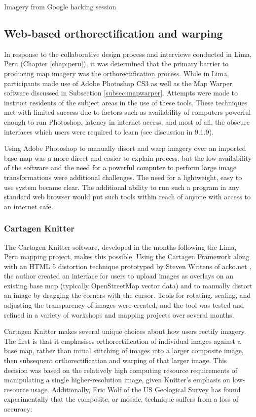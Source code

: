 \documentclass[11pt]{report}
\begin{document}
Imagery from Google hacking session

\subsection{Web-based orthorectification and warping}

In response to the collaborative design process and interviews conducted in Lima, Peru (Chapter \ref{chap:peru}), it was determined that the primary barrier to producing map imagery was the orthorectification process. While in Lima, participants made use of Adobe Photoshop CS3 as well as the Map Warper software discussed in Subsection \ref{subsec:mapwarper}. Attempts were made to instruct residents of the subject areas in the use of these tools. These techniques met with limited success due to factors such as availability of computers powerful enough to run Photoshop, latency in internet access, and most of all, the obscure interfaces which users were required to learn (see discussion in 9.1.9).  

Using Adobe Photoshop to manually disort and warp imagery over an imported base map was a more direct and easier to explain process, but the low availability of the software and the need for a powerful computer to perform large image transformations were additional challenges. The need for a lightweight, easy to use system became clear. The additional ability to run such a program in any standard web browser would put such tools within reach of anyone with access to an internet cafe.

\subsubsection{Cartagen Knitter}
\label{subsubsec:knitter}

The Cartagen Knitter software, developed in the months following the Lima, Peru mapping project, makes this possible. Using the Cartagen Framework along with an HTML 5 distortion technique prototyped by Steven Wittens of acko.net \cite{wittens2008projective}, the author created an interface for users to upload images as overlays on an existing base map (typically OpenStreetMap vector data) and to manually distort an image by dragging the corners with the cursor. Tools for rotating, scaling, and adjusting the transparency of images were created, and the tool was tested and refined in a variety of workshops and mapping projects over several months. 

Cartagen Knitter makes several unique choices about how users rectify imagery. The first is that it emphasises orthorectification of individual images against a base map, rather than initial stitching of images into a larger composite image, then subsequent orthorectification and warping of that larger image. This decision was based on the relatively high computing resource requirements of manipulating a single higher-resolution image, given Knitter's emphasis on low-resource usage. Additionally, Eric Wolf of the US Geological Survey has found experimentally that the composite, or mosaic, technique suffers from a loss of accuracy: 
\end{document}
